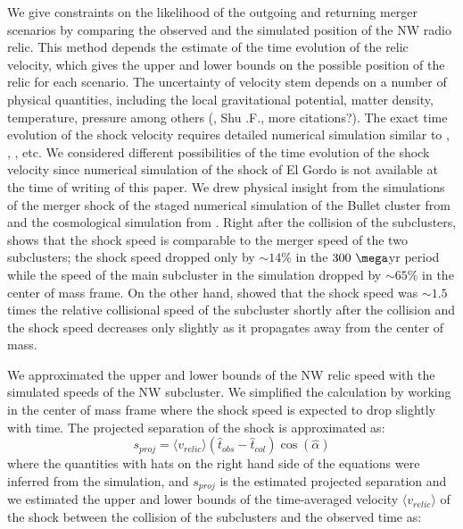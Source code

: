 We give constraints on the likelihood of the
outgoing and returning merger scenarios by comparing the observed and the
simulated position of the NW radio relic.
This method depends the estimate of the
time evolution of the relic velocity, which gives the upper and lower
bounds on the possible position of the relic for each scenario. The
uncertainty of velocity stem depends on a number of physical quantities, including the
local gravitational potential, matter density, temperature, pressure among
others (\citealt{E98}, Shu .F., more citations?).  The exact time evolution
of the shock velocity requires detailed numerical simulation similar to
\citet{Springel2007}, \citet{Vazza11}, \citet{Kang2007}, etc.  
We considered different possibilities of the time evolution of the shock
velocity since numerical simulation of the shock of El Gordo is not
available at the time of writing of this paper. We drew physical insight from the simulations of the merger shock of the
staged numerical simulation of the Bullet cluster from \citet{Springel2007}
and the cosmological simulation from \citet{Paul2011b}. Right after
the collision of the subclusters, \citet{Springel2007} shows that the shock speed is
comparable to the merger speed of the two subclusters; the shock speed
dropped only by $\sim 14\%$ in the $300~\mega$yr period while the speed of
the main subcluster in the simulation dropped by $\sim65\%$ in the center
of mass frame. On the other hand, \citet{Paul2011b} showed that the shock
speed was $\sim1.5$ times the relative collisional speed of the subcluster
shortly after the collision and the shock speed decreases only
slightly as it propagates away from the center of mass. \par  
We approximated the upper and lower bounds of the NW relic speed with the
simulated speeds of the NW subcluster.  We simplified the calculation by
working in the center of mass frame where the shock speed is expected to
drop slightly with time. 
The projected separation of the shock is approximated as:
\begin{equation}
	s_{proj} = \langle v_{relic} \rangle (\hat{t}_{obs} - \hat{t}_{col}) \cos(\hat{\alpha})
	\label{eqn: projectedsep}
\end{equation}
where the quantities with hats on the right hand side of the equations were
inferred from the simulation, and $s_{proj}$ is the estimated projected separation and we estimated the
upper and lower bounds of the time-averaged velocity
$\langle v_{relic} \rangle$ of the shock between
the collision of the subclusters and the observed time as:  
